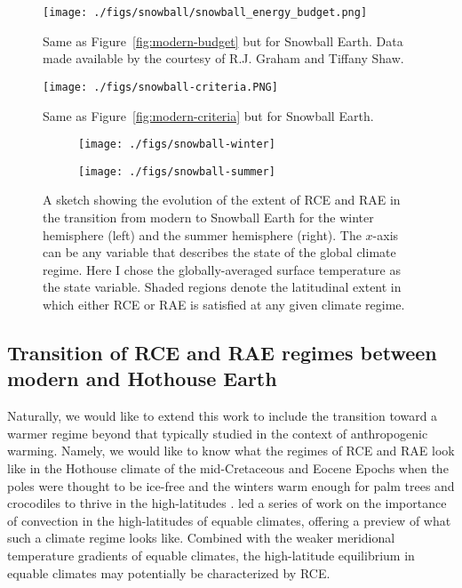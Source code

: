 \documentclass{article}
\begin{document}
\begin{figure}
\centering
\texttt{[image: ./figs/snowball/snowball\_energy\_budget.png]}
\caption{Same as Figure~\ref{fig:modern-budget} but for Snowball Earth. Data made available by the courtesy of R.J. Graham and Tiffany Shaw.}
\label{fig:snowball-budget}
\end{figure}

\begin{figure}
\centering
\texttt{[image: ./figs/snowball-criteria.PNG]}
\caption{Same as Figure~\ref{fig:modern-criteria} but for Snowball Earth.}
\label{fig:snowball-criteria}
\end{figure}

\begin{figure}
\centering
\begin{subfigure}{0.5\textwidth}
\texttt{[image: ./figs/snowball-winter]}
\end{subfigure}%
\begin{subfigure}{0.5\textwidth}
\texttt{[image: ./figs/snowball-summer]}
\end{subfigure}
\caption{A sketch showing the evolution of the extent of RCE and RAE in the transition from modern to Snowball Earth for the winter hemisphere (left) and the summer hemisphere (right). The $x$-axis can be any variable that describes the state of the global climate regime. Here I chose the globally-averaged surface temperature as the state variable. Shaded regions denote the latitudinal extent in which either RCE or RAE is satisfied at any given climate regime.}
\label{fig:snowball}
\end{figure}

\subsection{Transition of RCE and RAE regimes between modern and Hothouse Earth}

Naturally, we would like to extend this work to include the transition toward a warmer regime beyond that typically studied in the context of anthropogenic warming. Namely, we would like to know what the regimes of RCE and RAE look like in the Hothouse climate of the mid-Cretaceous and Eocene Epochs when the poles were thought to be ice-free and the winters warm enough for palm trees and crocodiles to thrive in the high-latitudes \citep{greenwood-wing-1995}. \citet{abbot-tziperman-2008} led a series of work on the importance of convection in the high-latitudes of equable climates, offering a preview of what such a climate regime looks like. Combined with the weaker meridional temperature gradients of equable climates, the high-latitude equilibrium in equable climates may potentially be characterized by RCE.
\end{document}
